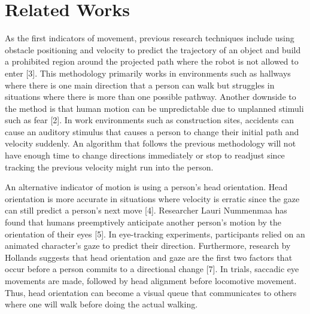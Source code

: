 \documentclass[letterpaper, 10 pt, conference]{ieeeconf}
\begin{document}
\section{Related Works}
As the first indicators of movement, previous research techniques include using obstacle positioning and velocity to predict the trajectory of an object and build a prohibited region around the projected path where the robot is not allowed to enter [3]. This methodology primarily works in environments such as hallways where there is one main direction that a person can walk but struggles in situations where there is more than one possible pathway. Another downside to the method is that human motion can be unpredictable due to unplanned stimuli such as fear [2]. In work environments such as construction sites, accidents can cause an auditory stimulus that causes a person to change their initial path and velocity suddenly. An algorithm that follows the previous methodology will not have enough time to change directions immediately or stop to readjust since tracking the previous velocity might run into the person.

An alternative indicator of motion is using a person's head orientation. Head orientation is more accurate in situations where velocity is erratic since the gaze can still predict a person's next move [4]. Researcher Lauri Nummenmaa has found that humans preemptively anticipate another person's motion by the orientation of their eyes [5]. In eye-tracking experiments, participants relied on an animated character's gaze to predict their direction. Furthermore, research by Hollands suggests that head orientation and gaze are the first two factors that occur before a person commits to a directional change [7]. In trials, saccadic eye movements are made, followed by head alignment before locomotive movement. Thus, head orientation can become a visual queue that communicates to others where one will walk before doing the actual walking.
\end{document}
